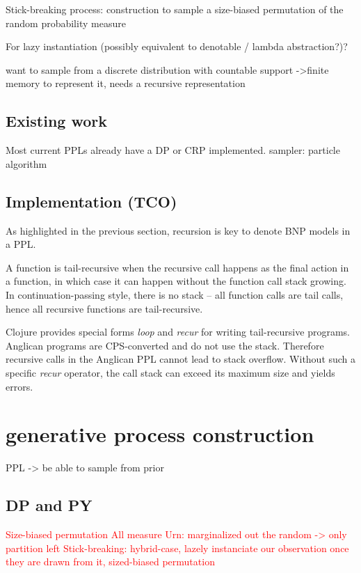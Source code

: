 Stick-breaking process: construction to sample a size-biased permutation of the random probability measure

For lazy instantiation (possibly equivalent to denotable / lambda abstraction?)?

want to sample from a discrete distribution with countable support
->finite memory
to represent it, needs a recursive representation

\subsection{Existing work}
Most current \glspl{PPL} already have a \gls{DP} or \gls{CRP} implemented.
sampler: particle algorithm

\subsection{Implementation (TCO)}
As highlighted in the previous section, recursion is key to denote \gls{BNP} models in a \gls{PPL}.

A function is tail-recursive when the recursive call happens as the final action in a function, in which case it can happen without the function call stack growing. In continuation-passing style, there is no stack – all function calls are tail calls, hence all recursive functions are tail-recursive.

Clojure provides special forms \emph{loop} and \emph{recur} for writing tail-recursive programs. Anglican programs are \gls{CPS}-converted and do not use the stack. Therefore recursive calls in the Anglican \gls{PPL} cannot lead to stack overflow.
Without such a specific \emph{recur} operator, the call stack can exceed its maximum size and yields errors.


\section{generative process construction}
PPL -> be able to sample from prior

\subsection{\gls{DP} and \gls{PY}}
\textcolor{red}{Size-biased permutation
All measure
Urn: marginalized out the random -> only partition left
Stick-breaking: hybrid-case, lazely instanciate our observation once they are drawn from it, sized-biased permutation }\\

